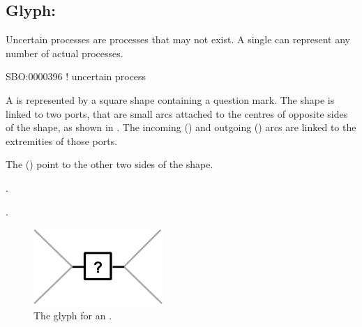 \subsection{Glyph: }
\label{sec:uncertain}

Uncertain processes are processes that may not exist. A single  can represent any number of actual processes.

\begin{glyphDescription}

\glyphSboTerm
SBO:0000396 ! uncertain process



\glyphContainer
A  is represented by a square shape containing a question mark.
The shape is linked to two ports, that are small arcs attached to the centres of opposite sides of the shape, as shown in .
The incoming  () and outgoing  () arcs are linked to the extremities of those ports.

The  () point to the other two sides of the shape.

\glyphLabel
{}.

\glyphAux
{}.

\end{glyphDescription}

\begin{figure}[H]
  \centering
  \includegraphics{images/uncertain}
  \caption{The \PD glyph for an .}
  \label{fig:uncertain}
\end{figure}
